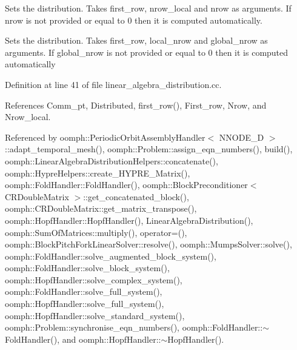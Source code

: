 Sets the distribution. Takes first\+\_\+row, nrow\+\_\+local and nrow as arguments. If nrow is not provided or equal to 0 then it is computed automatically. 

Sets the distribution. Takes first\+\_\+row, local\+\_\+nrow and global\+\_\+nrow as arguments. If global\+\_\+nrow is not provided or equal to 0 then it is computed automatically 

Definition at line 41 of file linear\+\_\+algebra\+\_\+distribution.\+cc.



References Comm\+\_\+pt, Distributed, first\+\_\+row(), First\+\_\+row, Nrow, and Nrow\+\_\+local.



Referenced by oomph\+::\+Periodic\+Orbit\+Assembly\+Handler$<$ N\+N\+O\+D\+E\+\_\+D $>$\+::adapt\+\_\+temporal\+\_\+mesh(), oomph\+::\+Problem\+::assign\+\_\+eqn\+\_\+numbers(), build(), oomph\+::\+Linear\+Algebra\+Distribution\+Helpers\+::concatenate(), oomph\+::\+Hypre\+Helpers\+::create\+\_\+\+H\+Y\+P\+R\+E\+\_\+\+Matrix(), oomph\+::\+Fold\+Handler\+::\+Fold\+Handler(), oomph\+::\+Block\+Preconditioner$<$ C\+R\+Double\+Matrix $>$\+::get\+\_\+concatenated\+\_\+block(), oomph\+::\+C\+R\+Double\+Matrix\+::get\+\_\+matrix\+\_\+transpose(), oomph\+::\+Hopf\+Handler\+::\+Hopf\+Handler(), Linear\+Algebra\+Distribution(), oomph\+::\+Sum\+Of\+Matrices\+::multiply(), operator=(), oomph\+::\+Block\+Pitch\+Fork\+Linear\+Solver\+::resolve(), oomph\+::\+Mumps\+Solver\+::solve(), oomph\+::\+Fold\+Handler\+::solve\+\_\+augmented\+\_\+block\+\_\+system(), oomph\+::\+Fold\+Handler\+::solve\+\_\+block\+\_\+system(), oomph\+::\+Hopf\+Handler\+::solve\+\_\+complex\+\_\+system(), oomph\+::\+Fold\+Handler\+::solve\+\_\+full\+\_\+system(), oomph\+::\+Hopf\+Handler\+::solve\+\_\+full\+\_\+system(), oomph\+::\+Hopf\+Handler\+::solve\+\_\+standard\+\_\+system(), oomph\+::\+Problem\+::synchronise\+\_\+eqn\+\_\+numbers(), oomph\+::\+Fold\+Handler\+::$\sim$\+Fold\+Handler(), and oomph\+::\+Hopf\+Handler\+::$\sim$\+Hopf\+Handler().

\mbox{\label{classoomph_1_1LinearAlgebraDistribution_a0cc6e977d9922918c86b4546a5cf1e1a}} 
